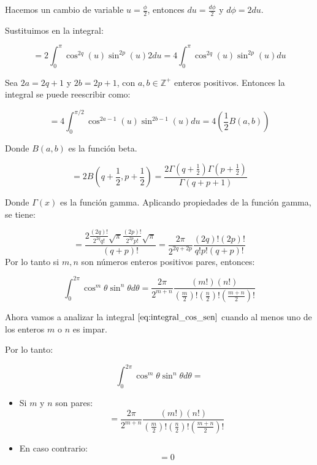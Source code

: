 Hacemos un cambio de variable $u=\frac{\phi}{2}$, entonces $du=\frac{d\phi}{2}$ y $d\phi=2du$.

Sustituimos en la integral:

\[
    =2\int_{0}^{\pi}\cos^{2q}\left(u\right)\sin^{2p}\left(u\right) 2du = 4\int_{0}^{\pi}\cos^{2q}\left(u\right)\sin^{2p}\left(u\right) du
\]

Sea $2a=2q+1$ y $2b=2p+1$, con $a,b\in\mathbb{Z}^+$ enteros positivos. Entonces la integral se puede reescribir como:

\[
    =4\int_{0}^{\pi/2}\cos^{2a-1}\left(u\right)\sin^{2b-1}\left(u\right) du = 4(\frac{1}{2}B(a,b))
\]

Donde $B(a,b)$ es la función beta.

\[
    =2B(q+\frac{1}{2},p+\frac{1}{2})=\frac{2\Gamma(q+\frac{1}{2})\Gamma(p+\frac{1}{2})}{\Gamma(q+p+1)}
\]

Donde $\Gamma(x)$ es la función gamma. Aplicando propiedades de la función gamma, se tiene:

\[
=\frac{2\frac{(2q)!}{2^{2q}q!}\sqrt{\pi}\frac{(2p)!}{2^{2p}p!}\sqrt{\pi}}{(q+p)!}=\frac{2\pi}{2^{2q+2p}}\frac{(2q)!(2p)!}{q!p!(q+p)!}
\]
Por lo tanto si $m,n$ son números enteros positivos pares, entonces:

\begin{equation}\label{eq: integral_cos_sen_pares}
    \int_{0}^{2\pi}\cos^m\theta\sin^n\theta d\theta = \frac{2\pi}{2^{m+n}}\frac{(m!)(n!)}{(\frac{m}{2})!(\frac{n}{2})!(\frac{m+n}{2})!}
\end{equation}

Ahora vamos a analizar la integral $\eqref{eq:integral_cos_sen}$ cuando al menos uno de los enteros $m$ o $n$ es impar.

Por lo tanto:

\begin{equation}\label{eq: integral_cos_sen_general}
    \int_{0}^{2\pi}\cos^m\theta\sin^n\theta d\theta=
\end{equation}
\begin{itemize}
    \item Si $m$ y $n$ son pares:
    \begin{equation}\label{eq: integral_cos_sen_general_pares}
        =\frac{2\pi}{2^{m+n}}\frac{(m!)(n!)}{(\frac{m}{2})!(\frac{n}{2})!(\frac{m+n}{2})!}
    \end{equation}
    \item En caso contrario:
    \begin{equation}\label{eq: integral_cos_sen_general_impar}
        =0
    \end{equation}
\end{itemize}


